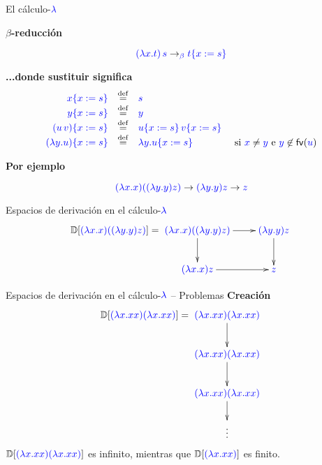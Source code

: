 \documentclass{beamer}
\newcommand{\cLam}[1]{{\color{darkBlue} #1}}
\newcommand{\clambda}{\cLam{\lambda}}
\begin{document}
\begin{frame}{El cálculo-$\clambda$}

\textbf{$\beta$-reducción}

\[
  \cLam{(\lam{x}{t})\, s} \to_\cLam{\beta} \cLam{\subs{t}{x}{s}}
\]
\vskip 0.5cm


\textbf{...donde sustituir significa}
\[
\begin{array}{rclc}
  \cLam{\subs{x}{x}{s}}            & \eqdef & \cLam{s} & \\
  \cLam{\subs{y}{x}{s}}            & \eqdef & \cLam{y} & \\
  \cLam{\subs{(u\, v)}{x}{s}}      & \eqdef & \cLam{\subs{u}{x}{s}\, \subs{v}{x}{s}} & \\
  \cLam{\subs{(\lam{y}{u})}{x}{s}} & \eqdef & \cLam{\lam{y}{\subs{u}{x}{s}}} & \text{ si } \cLam{x}\neq \cLam{y} \text{ e } \cLam{y} \not\in \fv{\cLam{u}} \\
\end{array}
\]

\textbf{Por ejemplo}

  \[\cLam{(\lam{x}{x}) ((\lam{y}{y}) z)} \to \cLam{(\lam{y}{y}) z} \to \cLam{z}\]


\end{frame}

\begin{frame}{Espacios de derivación en el cálculo-$\clambda$}
\[\ulbDeriv{\cLam{(\lam{x}{x}) ((\lam{y}{y}) z)}} =
\xymatrix@C=0.8cm{
\cLam{(\lam{x}{x}) ((\lam{y}{y}) z)} \ar[d] \ar[r] & \cLam{(\lam{y}{y}) z} \ar[d] \\
\cLam{(\lam{x}{x}) z}  \ar[r] & \cLam{z}
}
\]
\end{frame}

\begin{frame}{Espacios de derivación en el cálculo-$\clambda$ -- Problemas}
\textbf{Creación}
\[\ulbDeriv{\cLam{(\lam{x}{x x}) (\lam{x}{x x})}} =
\xymatrix@C=0.3cm{
\cLam{(\lam{x}{x x}) (\lam{x}{x x})} \ar[d] \\
\cLam{(\lam{x}{x x}) (\lam{x}{x x})} \ar[d] \\
\cLam{(\lam{x}{x x}) (\lam{x}{x x})} \ar[d] \\
\vdots  \\
}
\]
$\ulbDeriv{\cLam{(\lam{x}{x x}) (\lam{x}{x x})}}$ es infinito, mientras que
$\ulbDeriv{\cLam{(\lam{x}{x x})}}$ es finito.
\end{frame}
\end{document}
